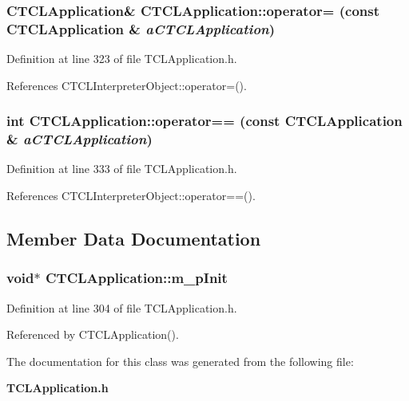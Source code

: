 \subsubsection{\setlength{\rightskip}{0pt plus 5cm}CTCLApplication\& CTCLApplication::operator= (const CTCLApplication \& {\em a\-CTCLApplication})\hspace{0.3cm}{\tt  [inline]}}\label{classCTCLApplication_a3}




Definition at line 323 of file TCLApplication.h.

References CTCLInterpreter\-Object::operator=().
\subsubsection{\setlength{\rightskip}{0pt plus 5cm}int CTCLApplication::operator== (const CTCLApplication \& {\em a\-CTCLApplication})\hspace{0.3cm}{\tt  [inline]}}\label{classCTCLApplication_a4}




Definition at line 333 of file TCLApplication.h.

References CTCLInterpreter\-Object::operator==().

\subsection{Member Data Documentation}
\subsubsection{\setlength{\rightskip}{0pt plus 5cm}void$\ast$ CTCLApplication::m\_\-p\-Init\hspace{0.3cm}{\tt  [private]}}\label{classCTCLApplication_o0}




Definition at line 304 of file TCLApplication.h.

Referenced by CTCLApplication().

The documentation for this class was generated from the following file:\begin{CompactItemize}
\item 
{\bf TCLApplication.h}\end{CompactItemize}
